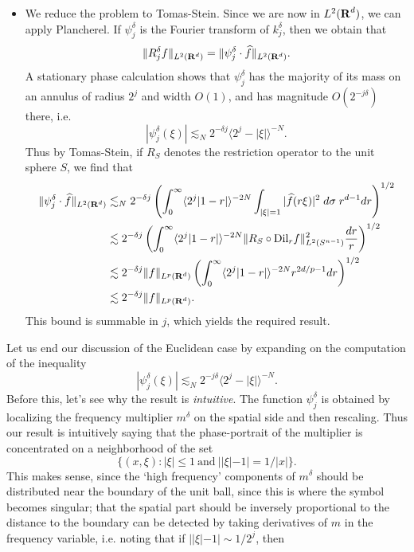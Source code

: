 \begin{itemize}
    \item We reduce the problem to Tomas-Stein. Since we are now in $L^2(\operatorname{\mathbf{R}}^d)$, we can apply Plancherel. If $\psi^\delta_j$ is the Fourier transform of $k^\delta_j$, then we obtain that
    \[ \| R^\delta_j f \|_{L^2(\operatorname{\mathbf{R}}^d)} = \| \psi^\delta_j \cdot \widehat{f} \|_{L^2(\operatorname{\mathbf{R}}^d)}. \]
    A stationary phase calculation shows that $\psi^\delta_j$ has the majority of its mass on an annulus of radius $2^j$ and width $O(1)$, and has magnitude $O(2^{-j\delta})$ there, i.e.
    \[ |\psi^\delta_j(\xi)| \lesssim_N 2^{-\delta j} \langle 2^j - |\xi| \rangle^{-N}. \]
    Thus by Tomas-Stein, if $R_S$ denotes the restriction operator to the unit sphere $S$, we find that
    \begin{align*}
        \| \psi^\delta_j \cdot \widehat{f} \|_{L^2(\operatorname{\mathbf{R}}^d)} &\lesssim_N 2^{-\delta j} \left( \int_0^\infty \langle 2^j |1 - r| \rangle^{-2N} \int_{|\xi| = 1} |\widehat{f}(r \xi)|^2\; d\sigma\; r^{d-1} dr \right)^{1/2}\\
        &\lesssim 2^{-\delta j} \left( \int_0^\infty \langle 2^j |1 - r| \rangle^{-2N} \| R_S \circ \text{Dil}_r f \|^2_{L^2(S^{n-1})} \frac{dr}{r} \right)^{1/2}\\
        &\lesssim  2^{-\delta j} \| f \|_{L^p(\operatorname{\mathbf{R}}^d)} \left( \int_0^\infty \langle 2^j |1 - r| \rangle^{-2N}  r^{2d/p - 1} dr \right)^{1/2}\\
        &\lesssim 2^{-\delta j} \| f \|_{L^p(\operatorname{\mathbf{R}}^d)}.
    \end{align*}
    This bound is summable in $j$, which yields the required result.
\end{itemize}
%
Let us end our discussion of the Euclidean case by expanding on the computation of the inequality
%
\[ |\psi^\delta_j(\xi)| \lesssim_N 2^{-j \delta} \langle 2^j - |\xi| \rangle^{-N}. \]
%
Before this, let's see why the result is \emph{intuitive}. The function $\psi^\delta_j$ is obtained by localizing the frequency multiplier $m^\delta$ on the spatial side and then rescaling. Thus our result is intuitively saying that the phase-portrait of the multiplier is concentrated on a neighborhood of the set
%
\[ \{ (x,\xi) : |\xi| \leq 1\ \text{and}\ ||\xi| - 1| = 1/|x| \}. \]
%
This makes sense, since the `high frequency' components of $m^\delta$ should be distributed near the boundary of the unit ball, since this is where the symbol becomes singular; that the spatial part should be inversely proportional to the distance to the boundary can be detected by taking derivatives of $m$ in the frequency variable, i.e. noting that if $||\xi| - 1| \sim 1/2^j$, then
